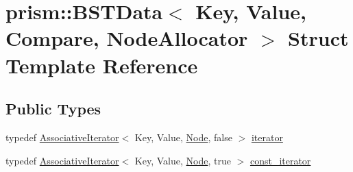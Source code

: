 \hypertarget{structprism_1_1_b_s_t_data}{}\section{prism\+:\+:B\+S\+T\+Data$<$ Key, Value, Compare, Node\+Allocator $>$ Struct Template Reference}
\label{structprism_1_1_b_s_t_data}
\subsection*{Public Types}
\begin{DoxyCompactItemize}
\item 
typedef \hyperlink{structprism_1_1_associative_iterator}{Associative\+Iterator}$<$ Key, Value, \hyperlink{structprism_1_1_b_s_t_node}{Node}, false $>$ \hyperlink{structprism_1_1_b_s_t_data_a45bbf30d426440d4c346529f898b840c}{iterator}
\item 
typedef \hyperlink{structprism_1_1_associative_iterator}{Associative\+Iterator}$<$ Key, Value, \hyperlink{structprism_1_1_b_s_t_node}{Node}, true $>$ \hyperlink{structprism_1_1_b_s_t_data_ae697fd0ffd6d0bbd6744baa8882fb812}{const\+\_\+iterator}
\end{DoxyCompactItemize}
